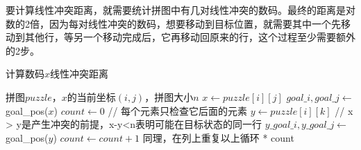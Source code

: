 \documentclass[10pt,letterpaper]{ctexart}
\newcommand{\figref}[1]{图\ref{#1}}
\begin{document}
\begin{enumerate}[itemindent=2.5em,label=\arabic*、]
\begin{enumerate}[itemindent=1.5em,label=（\arabic*）]
      \par \qquad 要计算线性冲突距离，就需要{\color{red}统计拼图中有几对线性冲突的数码}。{\color{red}最终的距离是对数的2倍}，因为每对线性冲突的数码，想要移动到目标位置，就需要其中一个先移动到其他行，等另一个移动完成后，它再移动回原来的行，这个过程至少需要额外的2步。
      \begin{algorithm}
        \caption{计算数码$x$线性冲突距离}
          \begin{algorithmic}[1] %
              \Require 拼图$puzzle$，$x$的当前坐标$(i,j)$，拼图大小$n$
                \State $x \gets puzzle[i][j]$
                \State $goal\_i,goal\_j \gets$ goal\_pos($x$)
                \State $count \gets 0$
                \State // 每个元素只检查它后面的元素
                \For {$k \in [j+1,n)$}
                  \State $y \gets puzzle[i][k]$
                  \State // x > y是产生冲突的前提，x-y<n表明可能在目标状态的同一行
                    \State $y\_goal\_i,y\_goal\_j \gets$ goal\_pos($y$)
                      \State $count \gets count + 1$
                    \EndIf
                  \EndIf
                \EndFor
                \State 同理，在列上重复以上循环
                \State {} * count
              \EndFunction
          \end{algorithmic}
      \end{algorithm}

    \end{enumerate}
\end{enumerate}
\end{document}

